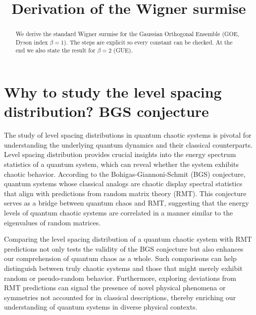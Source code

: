 \documentclass[10pt]{article}
\title{Derivation of the Wigner surmise}
\author{}
\date{}
\begin{document}
\maketitle

\begin{abstract}
We derive the standard Wigner surmise for the Gaussian Orthogonal 
Ensemble (GOE, Dyson index $\beta=1$). The steps are explicit so every 
constant can be checked. At the end we also state the result for 
$\beta=2$ (GUE). 
\end{abstract}

\section{Why to study the level spacing distribution? BGS conjecture}
The study of level spacing distributions in quantum chaotic systems is pivotal for 
understanding the underlying quantum dynamics and their classical counterparts. 
Level spacing distribution provides crucial insights into the energy spectrum 
statistics of a quantum system, which can reveal whether the system exhibits 
chaotic behavior. According to the Bohigas-Giannoni-Schmit (BGS) conjecture, 
quantum systems whose classical analogs are chaotic display spectral statistics 
that align with predictions from random matrix theory (RMT). This conjecture 
serves as a bridge between quantum chaos and RMT, suggesting that the energy 
levels of quantum chaotic systems are correlated in a manner similar to the 
eigenvalues of random matrices.

Comparing the level spacing distribution of a quantum chaotic system with RMT 
predictions not only tests the validity of the BGS conjecture but also enhances 
our comprehension of quantum chaos as a whole. Such comparisons can help 
distinguish between truly chaotic systems and those that might merely exhibit 
random or pseudo-random behavior. Furthermore, exploring deviations from RMT 
predictions can signal the presence of novel physical phenomena or symmetries 
not accounted for in classical descriptions, thereby enriching our understanding 
of quantum systems in diverse physical contexts.
\end{document}

